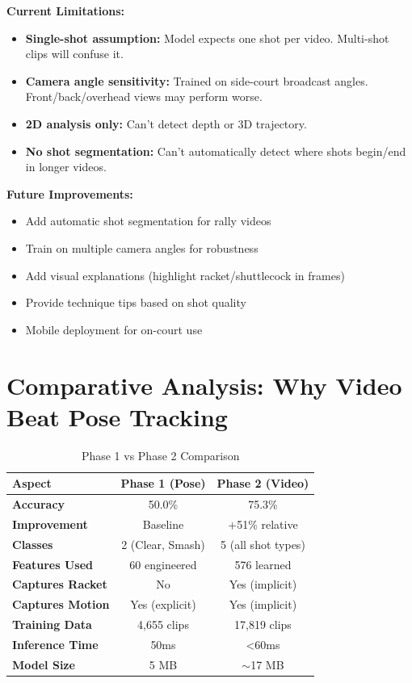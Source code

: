 \documentclass[11pt,a4paper]{article}
\begin{document}
\textbf{Current Limitations:}
\begin{itemize}
\item \textbf{Single-shot assumption:} Model expects one shot per video. Multi-shot clips will confuse it.
\item \textbf{Camera angle sensitivity:} Trained on side-court broadcast angles. Front/back/overhead views may perform worse.
\item \textbf{2D analysis only:} Can't detect depth or 3D trajectory.
\item \textbf{No shot segmentation:} Can't automatically detect where shots begin/end in longer videos.
\end{itemize}

\textbf{Future Improvements:}
\begin{itemize}
\item Add automatic shot segmentation for rally videos
\item Train on multiple camera angles for robustness
\item Add visual explanations (highlight racket/shuttlecock in frames)
\item Provide technique tips based on shot quality
\item Mobile deployment for on-court use
\end{itemize}

\section{Comparative Analysis: Why Video Beat Pose Tracking}

\begin{table}[H]
\centering
\caption{Phase 1 vs Phase 2 Comparison}
\begin{tabular}{lcc}
\toprule
\textbf{Aspect} & \textbf{Phase 1 (Pose)} & \textbf{Phase 2 (Video)} \\
\midrule
\textbf{Accuracy} & 50.0\% & 75.3\% \\
\textbf{Improvement} & Baseline & +51\% relative \\
\textbf{Classes} & 2 (Clear, Smash) & 5 (all shot types) \\
\textbf{Features Used} & 60 engineered & 576 learned \\
\textbf{Captures Racket} & No & Yes (implicit) \\
\textbf{Captures Motion} & Yes (explicit) & Yes (implicit) \\
\textbf{Training Data} & 4,655 clips & 17,819 clips \\
\textbf{Inference Time} & 50ms & \textless{}60ms \\
\textbf{Model Size} & 5 MB & $\sim$17 MB \\
\bottomrule
\end{tabular}
\end{table}
\end{document}
